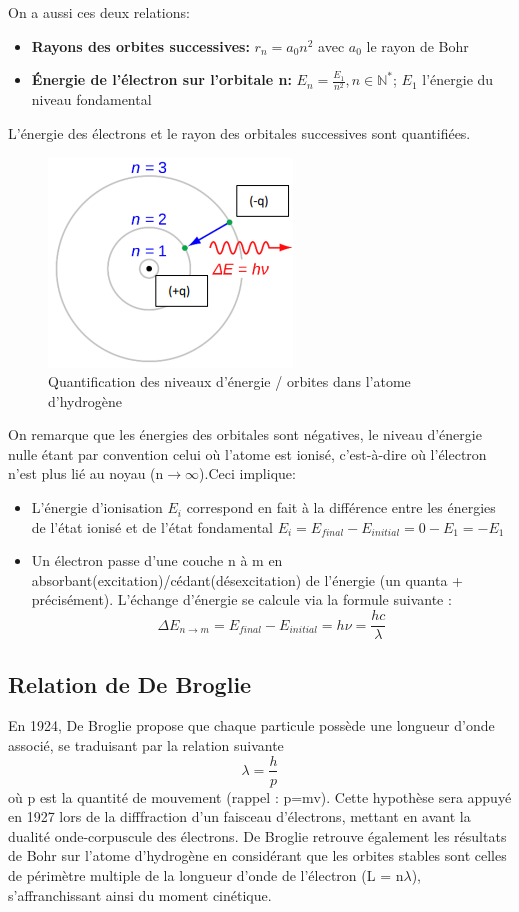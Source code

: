 \documentclass{article}
\begin{document}
On a aussi ces deux relations:
\begin{itemize}
    \item \textbf{Rayons des orbites successives:} $r_{n} = a_{0}n^{2}$ avec $a_{0}$ le rayon de Bohr
    \item \textbf{Énergie de l'électron sur l'orbitale n:} $E_{n} = \frac{E_{1}}{n^{2}}, n\in\mathbb{N^{*}}$; $E_{1}$ l'énergie du niveau fondamental 
\end{itemize}
L'énergie des électrons et le rayon des orbitales successives sont quantifiées.
\begin{figure}[h]
    \centering
    \includegraphics[scale=0.5]{figure_2.png}
    \caption{Quantification des niveaux d'énergie / orbites dans l'atome d'hydrogène}
\end{figure}

On remarque que les énergies des orbitales sont négatives, le niveau d'énergie nulle étant par convention celui où l'atome est ionisé, c'est-à-dire où l'électron n'est plus lié au noyau (n$\rightarrow\infty$).\newpage Ceci implique:
\begin{itemize}
    \item L'énergie d'ionisation $E_{i}$ correspond en fait à la différence entre les énergies de l'état ionisé et de l'état fondamental $E_{i} = E_{final} - E_{initial} = 0 - E_{1} = -E_{1}$
    \item Un électron passe d'une couche n à m en absorbant(excitation)/cédant(désexcitation) de l'énergie (un quanta + précisément). L'échange d'énergie se calcule via la formule suivante :
    \[ \Delta E_{n\to m} = E_{final}-E_{initial} = h\nu = \frac{hc}{\lambda} \]
\end{itemize}

\subsection{Relation de De Broglie}
En 1924, De Broglie propose que chaque particule possède une longueur d'onde associé, se traduisant par la relation suivante \[ \lambda = \frac{h}{p} \] où p est la quantité de mouvement (rappel : p=mv). Cette hypothèse sera appuyé en 1927 lors de la difffraction d'un faisceau d'électrons, mettant en avant la dualité onde-corpuscule des électrons. De Broglie retrouve également les résultats de Bohr sur l'atome d'hydrogène en considérant que les orbites stables sont celles de périmètre multiple de la longueur d'onde de l'électron (L = n$\lambda$), s'affranchissant ainsi du moment cinétique.
\end{document}
